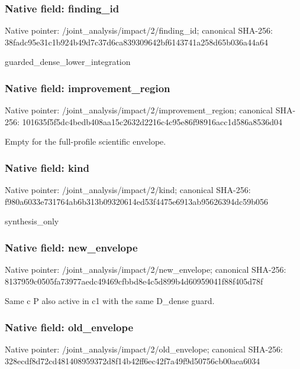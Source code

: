 \documentclass[10pt,a4paper]{article}
\begin{document}
\subsubsection{Native field: finding\_\allowbreak{}id}
Native pointer: /joint\_\allowbreak{}analysis/impact/2/finding\_\allowbreak{}id; canonical SHA-256: 38fadc95e31c1b924b49d7c37d6ca839309642bf6143741a258d65b036a44a64

\begingroup\raggedright\sloppy guarded\_\allowbreak{}dense\_\allowbreak{}lower\_\allowbreak{}integration\par\endgroup

\subsubsection{Native field: improvement\_\allowbreak{}region}
Native pointer: /joint\_\allowbreak{}analysis/impact/2/improvement\_\allowbreak{}region; canonical SHA-256: 101635f5f5dc4bedb408aa15c2632d2216c4c95e86f98916acc1d586a8536d04

\begingroup\raggedright\sloppy Empty for the full-profile scientific envelope.\par\endgroup

\subsubsection{Native field: kind}
Native pointer: /joint\_\allowbreak{}analysis/impact/2/kind; canonical SHA-256: f980a6033e731764ab6b313b09320614ed53f4475e6913ab95626394dc59b056

\begingroup\raggedright\sloppy synthesis\_\allowbreak{}only\par\endgroup

\subsubsection{Native field: new\_\allowbreak{}envelope}
Native pointer: /joint\_\allowbreak{}analysis/impact/2/new\_\allowbreak{}envelope; canonical SHA-256: 8137959c0505fa73977aedc49469cfbbd8e4c5d899b4d60959041f88f405d78f

\begingroup\raggedright\sloppy Same c P also active in c1 with the same D\_\allowbreak{}dense guard.\par\endgroup

\subsubsection{Native field: old\_\allowbreak{}envelope}
Native pointer: /joint\_\allowbreak{}analysis/impact/2/old\_\allowbreak{}envelope; canonical SHA-256: 328ecdf8d72cd481408959372d8f14b42ff6ec42f7a49f9d50756cb00aea6034
\end{document}
